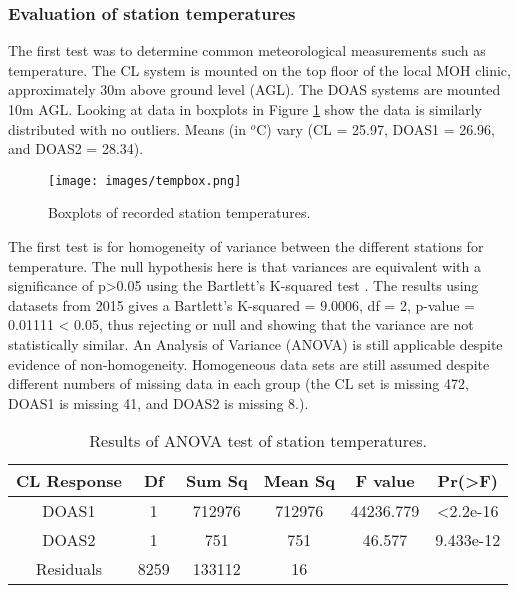 \subsubsection{Evaluation of station temperatures}
 The first test was to determine common meteorological measurements such as temperature.  The CL system is mounted on the top floor of the local MOH clinic, approximately 30m above ground level (AGL). The DOAS systems are mounted 10m AGL. Looking at data in boxplots in Figure \ref{fig:tempbox} show the data is similarly distributed with no outliers. Means (in $^{o}$C)  vary (CL = 25.97, DOAS1 = 26.96, and DOAS2 = 28.34).

%
\begin{figure}[H]
\centering
\texttt{[image: images/tempbox.png]} 
\caption{Boxplots of recorded station temperatures.}
\label{fig:tempbox}
\end{figure}
%

The first test is for homogeneity of variance between the different stations for temperature. The null hypothesis here is that variances are equivalent with a significance of p>0.05 using the Bartlett's K-squared test \citep{Mason2003}. The results using datasets from 2015 gives a Bartlett's K-squared = 9.0006, df = 2, p-value = 0.01111 < 0.05, thus rejecting or null and showing that the variance are not statistically similar. An Analysis of Variance (ANOVA) is still applicable despite evidence of non-homogeneity. Homogeneous data sets are still assumed despite different numbers of missing data in each group (the CL set is missing 472, DOAS1 is missing 41, and DOAS2 is missing 8.).

\begin{table}[H]
\centering
\caption{Results of ANOVA test of station temperatures.}
\label{tab:anovatemp}
\begin{tabular}{@{}cccccc@{}}
\toprule
\textbf{CL Response} & \textbf{Df} & \textbf{Sum Sq} & \textbf{Mean Sq} & \textbf{F value} & \textbf{Pr(>F)} \\ \midrule
DOAS1 & 1 & 712976 & 712976 & 44236.779 & \textless 2.2e-16  \\
DOAS2 & 1 & 751 & 751 & 46.577 & 9.433e-12  \\
Residuals & 8259 & 133112 & 16 &  &  \\ \bottomrule
\end{tabular}
\end{table}


